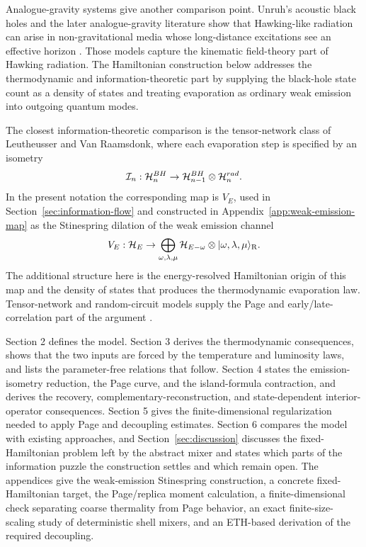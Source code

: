 \documentclass[12pt]{article}
\newcommand{\ket}[1]{|#1\rangle}
\begin{document}
Analogue-gravity systems give another comparison point.  Unruh's acoustic
black holes and the later analogue-gravity literature show that
Hawking-like radiation can arise in non-gravitational media whose long-distance
excitations see an effective horizon \cite{Unruh1981,Barcelo2011}.  Those
models capture the kinematic field-theory part of Hawking radiation.  The
Hamiltonian construction below addresses the thermodynamic and
information-theoretic part by supplying the black-hole state count as a density
of states and treating evaporation as ordinary weak emission into outgoing
quantum modes.

The closest information-theoretic comparison is the tensor-network class of
Leutheusser and Van Raamsdonk, where each evaporation step is specified by an
isometry
\begin{equation}
    {\cal I}_n:{\cal H}^{BH}_n\to {\cal H}^{BH}_{n-1}\otimes{\cal H}^{rad}_n .
\end{equation}
In the present notation the corresponding map is $V_E$, used in
Section~\ref{sec:information-flow} and constructed in
Appendix~\ref{app:weak-emission-map} as the Stinespring dilation of the weak
emission channel
\begin{equation}
    V_E:\mathcal H_E\to
    \bigoplus_{\omega,\lambda,\mu}
    \mathcal H_{E-\omega}\otimes\ket{\omega,\lambda,\mu}_{\rm R}.
\end{equation}
The additional structure here is the energy-resolved Hamiltonian origin of
this map and the density of states that produces the thermodynamic evaporation
law.  Tensor-network and random-circuit models supply the Page and
early/late-correlation part of the argument
\cite{LeutheusserVanRaamsdonk2017,PiroliSunderhaufQi2020}.

Section 2 defines the model.  Section 3 derives the thermodynamic
consequences, shows that the two inputs are forced by the temperature and
luminosity laws, and lists the parameter-free relations that follow.
Section 4 states the emission-isometry reduction, the Page curve, and the
island-formula contraction, and derives the recovery,
complementary-reconstruction, and state-dependent interior-operator
consequences.  Section 5 gives the
finite-dimensional
regularization needed to apply Page and decoupling estimates.  Section 6
compares the model with existing approaches, and Section~\ref{sec:discussion}
discusses the fixed-Hamiltonian problem left by the abstract mixer and states
which parts of the information puzzle the construction settles and which
remain open.  The
appendices give the
weak-emission Stinespring construction, a concrete fixed-Hamiltonian target,
the Page/replica moment calculation, a finite-dimensional check separating
coarse thermality from Page behavior, an exact finite-size-scaling study
of deterministic shell mixers, and an ETH-based derivation of the required
decoupling.
\end{document}
